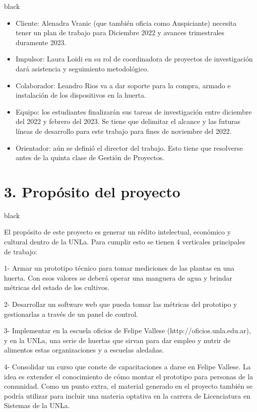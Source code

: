 \documentclass[
11pt, %
codirector, %
]{charter}
\begin{document}
\begin{consigna}{black}
\begin{itemize} 
	\item Cliente: Alenadra Vranic (que también oficia como Auspiciante) necesita tener un plan de trabajo para Diciembre 2022 y avances trimestrales duramente 2023.
	\item Impulsor: Laura Loidi en su rol de coordinadora de proyectos de investigación dará asistencia y seguimiento metodológico.	
	\item Colaborador: Leandro Rios va a dar soporte para la compra, armado e instalación de los dispositivos en la huerta.
	\item Equipo: los estudiantes finalizarán sus tareas de investigación entre diciembre del 2022 y febrero del 2023. Se tiene que delimitar el alcance y las futuras líneas de desarrollo para este trabajo para fines de noviembre del 2022.
	\item Orientador: aún se definió el director del trabajo. Esto tiene que resolverse antes de la quinta clase de Gestión de Proyectos.
\end{itemize}

\end{consigna}



\section{3. Propósito del proyecto}
\label{sec:proposito}

\begin{consigna}{black}

El propósito de este proyecto es generar un rédito intelectual, económico y cultural dentro de la UNLa. Para cumplir esto se tienen 4 verticales principales de trabajo:

1- Armar un prototipo técnico para tomar mediciones de las plantas en una huerta. Con esos valores se deberá operar una manguera de agua y brindar métricas del estado de los cultivos.

2- Desarrollar un software web que pueda tomar las métricas del prototipo y gestionarlas a través de un panel de control.

3- Implementar en la escuela oficios de Felipe Vallese (http://oficios.unla.edu.ar), y en la UNLa, una serie de huertas que sirvan para dar empleo y nutrir de alimentos estas organizaciones y a escuelas aledañas.

4- Consolidar un curso que conste de capacitaciones a darse en Felipe Vallese. La idea es extender el conocimiento de cómo montar el prototipo para personas de la comunidad.
Como un punto extra, el material generado en el proyecto también se podría utilizar para incluir una materia optativa en la carrera de Licenciatura en Sistemas de la UNLa.


\end{consigna}
\end{document}
